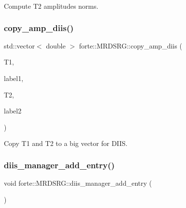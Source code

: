 Compute T2 amplitudes norms. 

\mbox{\label{classforte_1_1_m_r_d_s_r_g_a4aa8d2d07a9f7ef9baaefb680222b856}} 
\subsubsection{\texorpdfstring{copy\+\_\+amp\+\_\+diis()}{copy\_amp\_diis()}}
{\footnotesize\ttfamily std\+::vector$<$ double $>$ forte\+::\+M\+R\+D\+S\+R\+G\+::copy\+\_\+amp\+\_\+diis (\begin{DoxyParamCaption}\item[{Blocked\+Tensor \&}]{T1,  }\item[{const std\+::vector$<$ std\+::string $>$ \&}]{label1,  }\item[{Blocked\+Tensor \&}]{T2,  }\item[{const std\+::vector$<$ std\+::string $>$ \&}]{label2 }\end{DoxyParamCaption})\hspace{0.3cm}{\ttfamily [protected]}}



Copy T1 and T2 to a big vector for D\+I\+IS. 

\mbox{\label{classforte_1_1_m_r_d_s_r_g_af70cafb6763cb557d0be82d437f79584}} 
\subsubsection{\texorpdfstring{diis\+\_\+manager\+\_\+add\+\_\+entry()}{diis\_manager\_add\_entry()}}
{\footnotesize\ttfamily void forte\+::\+M\+R\+D\+S\+R\+G\+::diis\+\_\+manager\+\_\+add\+\_\+entry (\begin{DoxyParamCaption}{ }\end{DoxyParamCaption})\hspace{0.3cm}{\ttfamily [protected]}}



